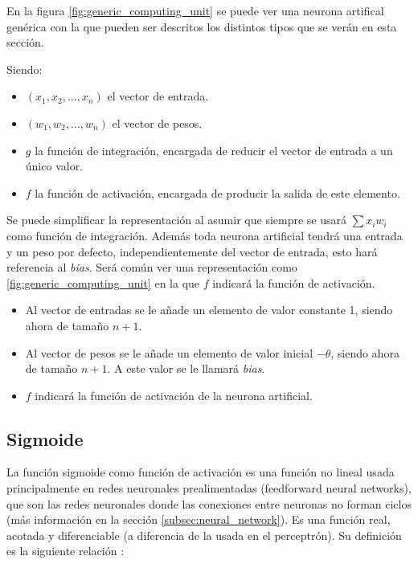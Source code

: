 En la figura \ref{fig:generic_computing_unit} se puede ver una neurona artifical genérica con la que pueden ser descritos los distintos tipos que se verán en esta sección.


Siendo:
\begin{itemize}
\item $ (x_1, x_2, ...,x_n) $ el vector de entrada.
\item $ (w_1, w_2, ...,w_n) $ el vector de pesos.
\item $ g $ la función de integración, encargada de reducir el vector de entrada a un único valor.
\item $ f $ la función de activación, encargada de producir la salida de este elemento.
\end{itemize}

Se puede simplificar la representación al asumir que siempre se usará $ \sum x_i w_i $ como función de integración. Además toda neurona artificial tendrá una entrada y un peso por defecto, independientemente del vector de entrada, esto hará referencia al \textit{bias}. Será común ver una representación como \ref{fig:generic_computing_unit} en la que $ f $ indicará la función de activación.


\begin{itemize}
\item Al vector de entradas se le añade un elemento de valor constante 1, siendo ahora de tamaño $ n+1 $.
\item Al vector de pesos se le añade un elemento de valor inicial $ -\theta $, siendo ahora de tamaño $ n+1 $. A este valor se le llamará \textit{bias}.
\item $ f $ indicará la función de activación de la neurona artificial.
\end{itemize}

\subsection{Sigmoide}\label{subsubsec:sigmoide}

La función sigmoide como función de activación es una función no lineal usada principalmente en redes neuronales prealimentadas (feedforward neural networks), que son las redes neuronales donde las conexiones entre neuronas no forman ciclos (más información en la sección \ref{subsec:neural_network}). Es una función real, acotada y diferenciable (a diferencia de la usada en el perceptrón). Su definición es la siguiente relación \cite{nwankpa2018activation}:

